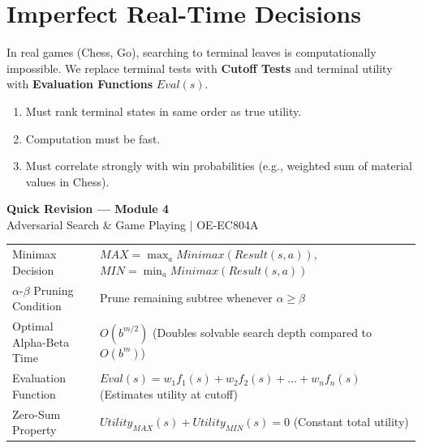 \documentclass[12pt,a4paper]{article}
\renewcommand{\arraystretch}{1.45}
\begin{document}
\section{Imperfect Real-Time Decisions}
In real games (Chess, Go), searching to terminal leaves is computationally impossible. We replace terminal tests with \textbf{Cutoff Tests} and terminal utility with \textbf{Evaluation Functions} $Eval(s)$.

\begin{tcolorbox}[examplebox, title={Requirements for Evaluation Functions}]
  \begin{enumerate}[leftmargin=*, noitemsep]
    \item Must rank terminal states in same order as true utility.
    \item Computation must be fast.
    \item Must correlate strongly with win probabilities (e.g., weighted sum of material values in Chess).
  \end{enumerate}
\end{tcolorbox}

\newpage
\begin{center}
  {\large\bfseries\color{myred} Quick Revision --- Module 4}\\[3pt]
  {\small\color{mydark} Adversarial Search \& Game Playing $|$ OE-EC804A}
\end{center}
\noindent{\color{myred}\rule{\linewidth}{1.2pt}}
\vspace{4pt}

\begin{tcolorbox}[formulabox, title={\textbf{Key Concepts and Metrics at a Glance}}]
\renewcommand{\arraystretch}{1.35}
\begin{tabularx}{\linewidth}{B{4.5cm} X}
Minimax Decision & $MAX = \max_{a} Minimax(Result(s,a))$, $MIN = \min_{a} Minimax(Result(s,a))$ \\[4pt]
$\alpha$-$\beta$ Pruning Condition & Prune remaining subtree whenever $\alpha \ge \beta$ \\[4pt]
Optimal Alpha-Beta Time & $O(b^{m/2})$ \quad (Doubles solvable search depth compared to $O(b^m)$) \\[4pt]
Evaluation Function & $Eval(s) = w_1 f_1(s) + w_2 f_2(s) + \dots + w_n f_n(s)$ \quad (Estimates utility at cutoff) \\[4pt]
Zero-Sum Property & $Utility_{MAX}(s) + Utility_{MIN}(s) = 0$ \quad (Constant total utility) \\
\end{tabularx}
\end{tcolorbox}
\end{document}
